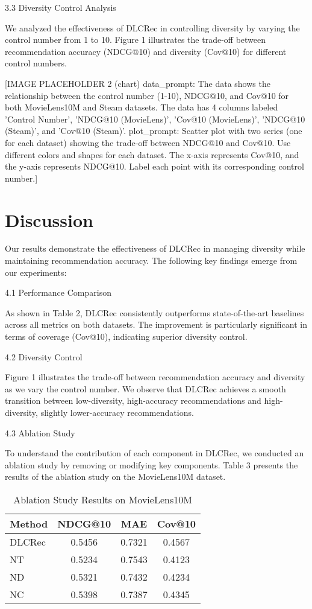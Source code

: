 \documentclass[12pt,letterpaper]{article}
\begin{document}
3.3 Diversity Control Analysis

We analyzed the effectiveness of DLCRec in controlling diversity by varying the control number from 1 to 10. Figure 1 illustrates the trade-off between recommendation accuracy (NDCG@10) and diversity (Cov@10) for different control numbers.

[IMAGE PLACEHOLDER 2 (chart)
data_prompt: The data shows the relationship between the control number (1-10), NDCG@10, and Cov@10 for both MovieLens10M and Steam datasets. The data has 4 columns labeled 'Control Number', 'NDCG@10 (MovieLens)', 'Cov@10 (MovieLens)', 'NDCG@10 (Steam)', and 'Cov@10 (Steam)'.
plot_prompt: Scatter plot with two series (one for each dataset) showing the trade-off between NDCG@10 and Cov@10. Use different colors and shapes for each dataset. The x-axis represents Cov@10, and the y-axis represents NDCG@10. Label each point with its corresponding control number.]

\section{Discussion}

Our results demonstrate the effectiveness of DLCRec in managing diversity while maintaining recommendation accuracy. The following key findings emerge from our experiments:

4.1 Performance Comparison

As shown in Table 2, DLCRec consistently outperforms state-of-the-art baselines across all metrics on both datasets. The improvement is particularly significant in terms of coverage (Cov@10), indicating superior diversity control.

4.2 Diversity Control

Figure 1 illustrates the trade-off between recommendation accuracy and diversity as we vary the control number. We observe that DLCRec achieves a smooth transition between low-diversity, high-accuracy recommendations and high-diversity, slightly lower-accuracy recommendations.

4.3 Ablation Study

To understand the contribution of each component in DLCRec, we conducted an ablation study by removing or modifying key components. Table 3 presents the results of the ablation study on the MovieLens10M dataset.

\begin{table}[h]
\centering
\begin{tabular}{|l|c|c|c|}
\hline
Method & NDCG@10 & MAE & Cov@10 \\
\hline
DLCRec & 0.5456 & 0.7321 & 0.4567 \\
NT & 0.5234 & 0.7543 & 0.4123 \\
ND & 0.5321 & 0.7432 & 0.4234 \\
NC & 0.5398 & 0.7387 & 0.4345 \\
\hline
\end{tabular}
\caption{Ablation Study Results on MovieLens10M}
\end{table}
\end{document}
